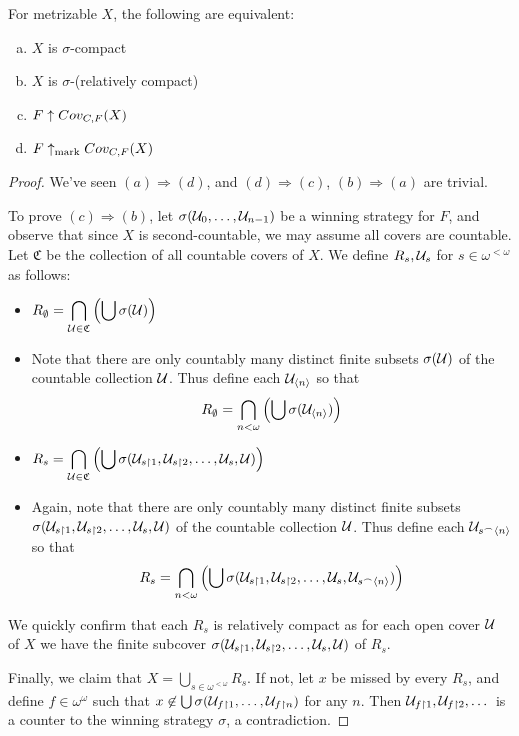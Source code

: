   \begin{theorem}
    For metrizable $X$, the following are equivalent:
      \begin{enumerate}[(a)]
        \item $X$ is $\sigma$-compact
        \item $X$ is $\sigma$-(relatively compact)
        \item $F \uparrow Cov_{C,F}(X)$
        \item $F\uparrow_{\text{mark}} Cov_{C,F}(X)$
      \end{enumerate}
  \end{theorem}

  \begin{proof}
    We've seen $(a) \Rightarrow (d)$, and $(d)\Rightarrow(c)$, $(b)\Rightarrow(a)$ are trivial.

    To prove $(c)\Rightarrow(b)$, let $\sigma(\mathcal{U}_0,\dots,\mathcal{U}_{n-1})$ be a winning strategy for $F$, and observe that since $X$ is second-countable, we may assume all covers are countable. Let $\mathfrak{C}$ be the collection of all countable covers of $X$. We define $R_s,\mathcal{U}_s$ for $s\in\omega^{<\omega}$ as follows:
      \begin{itemize}
        \item $\displaystyle R_\emptyset = \bigcap_{\mathcal{U}\in\mathfrak{C}} \left(\bigcup \sigma(\mathcal{U})\right)$
        \item Note that there are only countably many distinct finite subsets $\sigma(\mathcal{U})$ of the countable collection $\mathcal{U}$. Thus define each $\mathcal{U}_{\langle n\rangle}$ so that
          \[
            R_\emptyset = 
            \bigcap_{n<\omega}\left(\bigcup\sigma(\mathcal{U}_{\langle n\rangle})\right)
          \]
        \item $\displaystyle R_s = \bigcap_{\mathcal{U}\in\mathfrak{C}} \left(\bigcup \sigma(\mathcal{U}_{s\restriction1},\mathcal{U}_{s\restriction2},\dots,\mathcal{U}_s,\mathcal{U})\right)$
        \item Again, note that there are only countably many distinct finite subsets $\sigma(\mathcal{U}_{s\restriction1},\mathcal{U}_{s\restriction2},\dots,\mathcal{U}_s,\mathcal{U})$ of the countable collection $\mathcal{U}$. Thus define each $\mathcal{U}_{s^\frown\langle n\rangle}$ so that 
          \[
            R_s = 
            \bigcap_{n<\omega} \left(\bigcup \sigma(\mathcal{U}_{s\restriction1},\mathcal{U}_{s\restriction2},\dots,\mathcal{U}_s,\mathcal{U}_{s^\frown\langle n\rangle})\right)
          \]
      \end{itemize}

    We quickly confirm that each $R_s$ is relatively compact as for each open cover $\mathcal{U}$ of $X$ we have the finite subcover $\sigma(\mathcal{U}_{s\restriction1},\mathcal{U}_{s\restriction2},\dots,\mathcal{U}_s,\mathcal{U})$ of $R_s$.

    Finally, we claim that $X = \bigcup_{s\in\omega^{<\omega}} R_s$. If not, let $x$ be missed by every $R_s$, and define $f\in\omega^\omega$ such that $x\not\in \bigcup\sigma(\mathcal{U}_{f\restriction1},\dots,\mathcal{U}_{f\restriction n})$ for any $n$. Then $\mathcal{U}_{f\restriction1},\mathcal{U}_{f\restriction2},\dots$ is a counter to the winning strategy $\sigma$, a contradiction.
  \end{proof}

